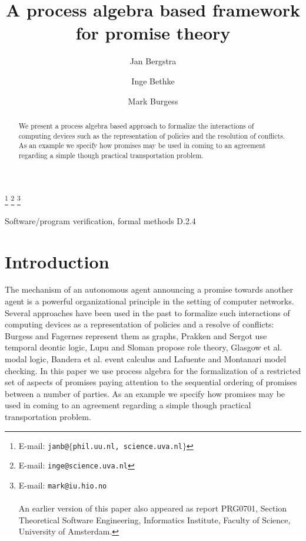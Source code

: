 \documentclass{pseudoelsart}
\begin{document}
 
\begin{frontmatter} 
\title{A process algebra based framework for promise theory}
\author[label1,label2]{Jan  Bergstra} 
\author[label1]{Inge Bethke}
\author[label3]{Mark Burgess}
\thanks[email1]{E-mail: \texttt{janb@}$\{$\texttt{phil.uu.nl, science.uva.nl}$\}$}
\thanks[email2]{E-mail:  \texttt{inge@science.uva.nl}}
\thanks[email3]{E-mail:  \texttt{mark@iu.hio.no}\\
\mbox{}\\
An earlier version 
of this paper also appeared as report PRG0701, Section Theoretical Software Engineering, 
Informatics Institute, 
Faculty of Science, University of Amsterdam.}
\address[label1]{University of Amsterdam, Faculty of Science, Section Theoretical
Software
Engineering (former Programming Research Group)} 
\address[label2]{Utrecht University, Department of Philosophy, Applied Logic
Group}
\address[label3]{University College Oslo, Faculty of Engineering}
\begin{abstract}
We present a process algebra based approach to formalize the interactions of computing devices
such as the representation of policies and the resolution of conflicts. As an example we specify how
promises may be used in coming to an agreement regarding a simple though
practical transportation problem.
\end{abstract}
\begin{keyword}
Software/program verification, formal methods D.2.4
\end{keyword}
\end{frontmatter}
\section{Introduction}
The mechanism of an autonomous agent announcing a promise towards another agent
is a powerful organizational principle in the setting of computer networks.
Several approaches have been used in the past to formalize such interactions of
computing devices as a
representation of policies and a resolve of conflicts: 
Burgess and Fagernes \cite{BF06}
represent them as graphs, Prakken and Sergot \cite{PS96,PS97} use temporal
deontic logic, Lupu and Sloman \cite{LS97} propose role theory, Glasgow et al.
\cite{GMP92} modal logic, Bandera et al. \cite{BLMR04} event
calculus and  Lafuente and Montanari \cite{LM05} model checking.
In this paper we use process algebra \cite{BPS01} for the formalization of a
restricted set of aspects of promises paying attention to the sequential
ordering of promises between a number of parties. As an example we specify how
promises may be used in coming to an agreement regarding a simple though
practical transportation problem.
\end{document}
